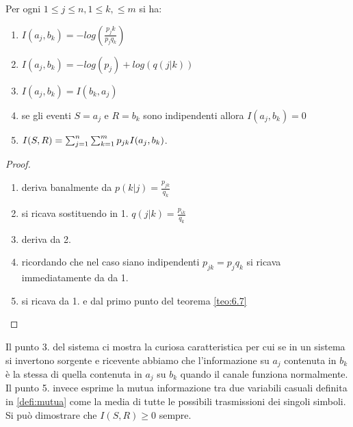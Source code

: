 \begin{teo}
Per ogni $1\leq j \leq n , 1 \leq k, \leq m$ si ha:
\begin{enumerate}
\item $I(a_j,b_k)=-log(\frac{p_jk}{p_j q_k})$
\item $I(a_j,b_k)=-log(p_j)+log(q(j|k))$
\item $I(a_j,b_k)=I(b_k,a_j)$
\item se gli eventi $S=a_j$ e $R=b_k$ sono indipendenti allora $I(a_j,b_k)=0$
\item $I(S,R)=\sum_{j=1}^n \sum_{k=1}^m p_{jk}I(a_j,b_k)$.
\end{enumerate}
\end{teo}
\begin{proof}
\begin{enumerate}
\item deriva banalmente da $p(k|j)=\frac{p_{jk}}{q_k}$
\item si ricava sostituendo in 1. $q(j|k)=\frac{p_{ik}}{q_k}$
\item deriva da 2.
\item ricordando che nel caso siano indipendenti $p_{jk}=p_jq_k$ si ricava immediatamente da da 1.
\item si ricava da 1. e dal primo punto del teorema \ref{teo:6.7}
\end{enumerate}
\end{proof}

Il punto 3. del sistema ci mostra la curiosa caratteristica per cui se in un sistema si invertono sorgente e ricevente abbiamo che l'informazione su $a_j$ contenuta in $b_k$ è la stessa di quella contenuta in $a_j$ su $b_k$ quando il canale funziona normalmente. Il punto 5. invece esprime la mutua informazione tra due variabili casuali definita in \ref{defi:mutua} come la media di tutte le possibili trasmissioni dei singoli simboli. Si può dimostrare che $I(S,R)\geq 0$ sempre.\\

